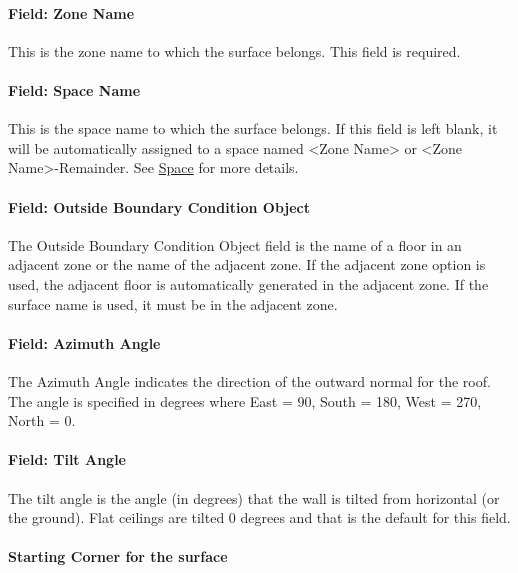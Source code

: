 \paragraph{Field: Zone Name}\label{field-zone-name-6-004}

This is the zone name to which the surface belongs. This field is required.

\paragraph{Field: Space Name}\label{field-space-name-6-004}

This is the space name to which the surface belongs. If this field is left blank, it will be automatically assigned to a space named <Zone Name> or <Zone Name>-Remainder. See \hyperref[space]{Space} for more details.

\paragraph{Field: Outside Boundary Condition Object}\label{field-outside-boundary-condition-object-1}

The Outside Boundary Condition Object field is the name of a floor in an adjacent zone or the name of the adjacent zone. If the adjacent zone option is used, the adjacent floor is automatically generated in the adjacent zone. If the surface name is used, it must be in the adjacent zone.

\paragraph{Field: Azimuth Angle}\label{field-azimuth-angle-6}

The Azimuth Angle indicates the direction of the outward normal for the roof. The angle is specified in degrees where East = 90, South = 180, West = 270, North = 0.

\paragraph{Field: Tilt Angle}\label{field-tilt-angle-6}

The tilt angle is the angle (in degrees) that the wall is tilted from horizontal (or the ground). Flat ceilings are tilted 0 degrees and that is the default for this field.

\paragraph{Starting Corner for the surface}\label{starting-corner-for-the-surface-6}

